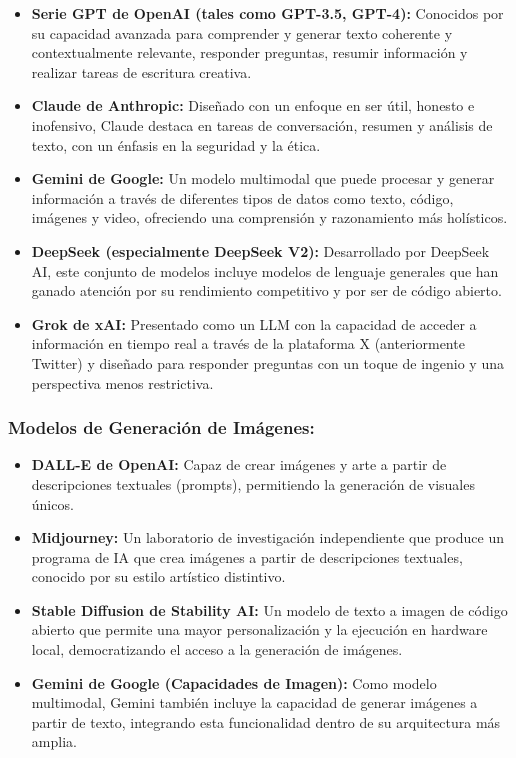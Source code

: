 \documentclass[12pt,a4paper]{report}
\begin{document}
\begin{itemize}
\item \textbf{Serie GPT de OpenAI (tales como GPT-3.5, GPT-4):} Conocidos por su capacidad avanzada para comprender y generar texto coherente y contextualmente relevante, responder preguntas, resumir información y realizar tareas de escritura creativa.

\item \textbf{Claude de Anthropic:} Diseñado con un enfoque en ser útil, honesto e inofensivo, Claude destaca en tareas de conversación, resumen y análisis de texto, con un énfasis en la seguridad y la ética.

\item \textbf{Gemini de Google:} Un modelo multimodal que puede procesar y generar información a través de diferentes tipos de datos como texto, código, imágenes y video, ofreciendo una comprensión y razonamiento más holísticos.

\item \textbf{DeepSeek (especialmente DeepSeek V2):} Desarrollado por DeepSeek AI, este conjunto de modelos incluye modelos de lenguaje generales que han ganado atención por su rendimiento competitivo y por ser de código abierto.

\item \textbf{Grok de xAI:} Presentado como un LLM con la capacidad de acceder a información en tiempo real a través de la plataforma X (anteriormente Twitter) y diseñado para responder preguntas con un toque de ingenio y una perspectiva menos restrictiva.
\end{itemize}

\subsubsection{Modelos de Generación de Imágenes:}

\begin{itemize}
\item \textbf{DALL-E de OpenAI:} Capaz de crear imágenes y arte a partir de descripciones textuales (prompts), permitiendo la generación de visuales únicos.

\item \textbf{Midjourney:} Un laboratorio de investigación independiente que produce un programa de IA que crea imágenes a partir de descripciones textuales, conocido por su estilo artístico distintivo.

\item \textbf{Stable Diffusion de Stability AI:} Un modelo de texto a imagen de código abierto que permite una mayor personalización y la ejecución en hardware local, democratizando el acceso a la generación de imágenes.

\item \textbf{Gemini de Google (Capacidades de Imagen):} Como modelo multimodal, Gemini también incluye la capacidad de generar imágenes a partir de texto, integrando esta funcionalidad dentro de su arquitectura más amplia.
\end{itemize}
\end{document}
